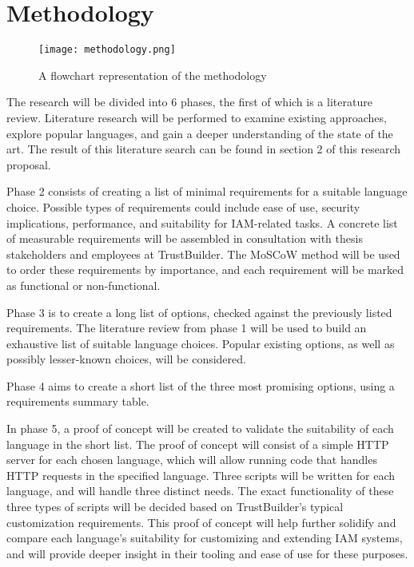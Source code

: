 \section{Methodology}%
\label{sec:methodology}

\begin{figure}[h]
    \centering
    \texttt{[image: methodology.png]}
    \caption{A flowchart representation of the methodology}
\end{figure}

The research will be divided into 6 phases, the first of which is a literature review. Literature research will be performed to examine existing approaches, explore popular languages, and gain a deeper understanding of the state of the art. The result of this literature search can be found in section 2 of this research proposal.

Phase 2 consists of creating a list of minimal requirements for a suitable language choice. Possible types of requirements could include ease of use, security implications, performance, and suitability for IAM-related tasks. A concrete list of measurable requirements will be assembled in consultation with thesis stakeholders and employees at TrustBuilder. The MoSCoW method will be used to order these requirements by importance, and each requirement will be marked as functional or non-functional.

Phase 3 is to create a long list of options, checked against the previously listed requirements. The literature review from phase 1 will be used to build an exhaustive list of suitable language choices. Popular existing options, as well as possibly lesser-known choices, will be considered.

Phase 4 aims to create a short list of the three most promising options, using a requirements summary table.

In phase 5, a proof of concept will be created to validate the suitability of each language in the short list. The proof of concept will consist of a simple HTTP server for each chosen language, which will allow running code that handles HTTP requests in the specified language. Three scripts will be written for each language, and will handle three distinct needs. The exact functionality of these three types of scripts will be decided based on TrustBuilder's typical customization requirements. This proof of concept will help further solidify and compare each language's suitability for customizing and extending IAM systems, and will provide deeper insight in their tooling and ease of use for these purposes.

